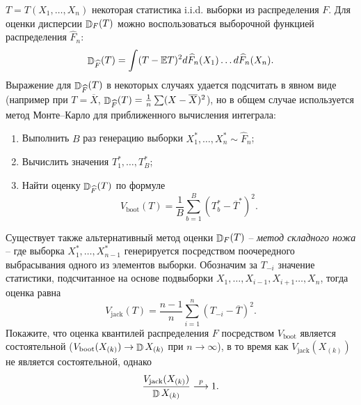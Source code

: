 \begin{problem}
$T = T(X_1,\ldots,X_n)$ некоторая статистика i.i.d. выборки из распределения $F$.  Для оценки дисперсии $\mathop{\mathbb{D}}\nolimits_F (T)$ можно воспользоваться выборочной функцией распределения $\widehat{F}_n$:
\[
\mathop{\mathbb{D}}\nolimits_{\widehat{F}} (T) = \int (T - \mathrm{{\mathbb E}} T)^2 d\widehat{F}_n(X_1) \ldots d\widehat{F}_n(X_n).
\]
Выражение для $\mathop{\mathbb{D}}\nolimits_{\widehat{F}} (T)$ в некоторых случаях удается подсчитать в явном виде (например при $T = \overline{X}$, $\mathop{\mathbb{D}}\nolimits_{\widehat{F}} (T) = \frac{1}{n} \sum (X - \overline{X})^2$),  но в общем случае используется метод Монте--Карло для приближенного вычисления интеграла:
\begin{enumerate}
\item Выполнить $B$ раз генерацию выборки $X_1^*,\ldots,X_n^* \sim \widehat{F}_n$;
\item Вычислить значения $T_1^*,\ldots,T_B^*$;
\item Найти оценку $\mathop{\mathbb{D}}\nolimits_{\widehat{F}} (T)$ по формуле
\[
V_{\text{boot}}(T) = \frac{1}{B} \sum_{b=1}^B \left( T_b^* -  \overline{T}^* \right)^2.
\]  
\end{enumerate}

Существует также альтернативный метод оценки $\mathop{\mathbb{D}}\nolimits_F (T)$ -- \textit{метод складного ножа} -- где выборка $X_1^*,\ldots,X_{n-1}^*$ генерируется посредством поочередного выбрасывания одного из элементов выборки. 
Обозначим за $T_{-i}$ значение статистики, подсчитанное на основе подвыборки  $X_1,\ldots,X_{i-1},X_{i+1}\ldots,X_n$, тогда оценка равна  
\[
V_{\text{jack}}(T) = \frac{n-1}{n} \sum_{i=1}^n \left( T_{-i} -  \overline{T} \right)^2.
\]  
Покажите, что оценка квантилей распределения $F$ посредством $V_{\text{boot}}$ является состоятельной ($V_{\text{boot}}(X_{(k)}) \to \mathop{\mathbb{D}}\nolimits X_{(k)} $ при $n \to \infty$), в то время как $V_{\text{jack}}(X_{(k)}) $ не является состоятельной, однако
\[
\frac{
V_{\text{jack}}(X_{(k)})  }{ \mathop{\mathbb{D}}\nolimits X_{(k)} 
} \overset{p}{\longrightarrow} 1.
\] 

\end{problem}

